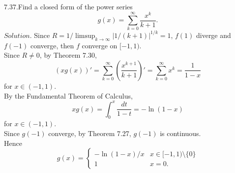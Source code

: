 \documentclass[12pt]{book}
\begin{document}
\begin{CJK}{UTF8}{bsmi}
7.37.Find a closed form of the power series
\[
    g(x) = \sum_{k=0}^\infty \frac{x^k}{k+1}.
\]
$Solution$. Since $R = 1/\limsup_{k\rightarrow\infty}|1/(k+1)|^{1/k} = 1$, $f(1)$ diverge and $f(-1)$ converge, then $f$ converge on $[-1, 1)$. \\
Since $R\ne0$, by Theorem 7.30, 
\[
    (x g(x))'
    = \sum_{k=0}^\infty \left( \frac{x^{k+1}}{k+1} \right)'
    = \sum_{k=0}^\infty x^k
    = \frac{1}{1-x}
\]
for $x\in(-1, 1)$. \\
By the Fundamental Theorem of Calculus, 
\[
    x g(x)
    = \int_0^x \frac{dt}{1-t}
    = -\ln(1-x)
\]
for $x\in(-1, 1)$. \\
Since $g(-1)$ converge, by Theorem 7.27, $g(-1)$ is continuous. \\
Hence 
\[
    g(x)
    = \left\{\begin{matrix}
        -\ln(1-x)/x & x\in[-1, 1)\setminus\{0\} \\
        1 & x=0.
    \end{matrix}\right.
\]

\end{CJK}
\end{document}

